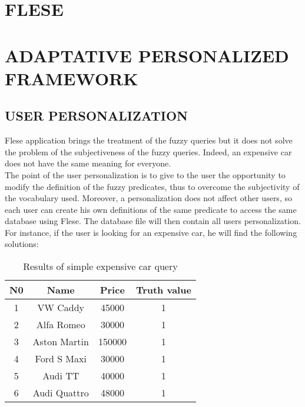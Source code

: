 \documentclass[a4paper,twoside]{article}
\begin{document}

\section{\uppercase{FLESE}}

\section{\uppercase{ADAPTATIVE PERSONALIZED FRAMEWORK}}

\subsection{USER PERSONALIZATION}

\noindent Flese application brings the treatment of the fuzzy queries but it does not solve the problem of the subjectiveness of the fuzzy queries. Indeed, an expensive car does not have the same meaning for everyone.\\

\noindent The point of the user personalization is to give to the user the opportunity to modify the definition of the fuzzy predicates, thus to overcome the subjectivity of the vocabulary used. Moreover, a personalization does not affect other users, so each user can create his own definitions of the same predicate to access the same database using Flese. The database file will then contain all users personalization.\\

\noindent For instance, if the user is looking for an expensive car, he will find the following solutions: \\

\begin{table}[h]
\caption{Results of simple expensive car query}\label{tab:simpleQuery1} \centering
\begin{tabular}{|c|c|c|c|}
  \hline
  N0 & Name & Price & Truth value\\
  \hline
  1 & VW Caddy & 45000 & 1\\
  \hline
  2 & Alfa Romeo & 30000 & 1 \\
  \hline
  3 & Aston Martin & 150000 & 1 \\
  \hline
  4 & Ford S Maxi & 30000 & 1 \\
  \hline
  5 & Audi TT & 40000 & 1 \\
  \hline
  6 & Audi Quattro & 48000 & 1 \\ 
  \hline
\end{tabular}
\end{table}
\end{document}
